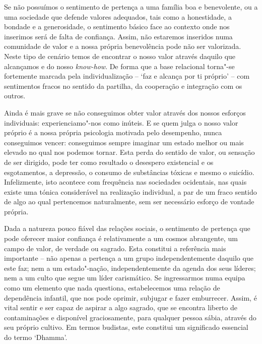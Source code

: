 Se não possuímos o sentimento de pertença a uma família boa e benevolente, ou a
uma sociedade que defende valores adequados, tais como a honestidade, a bondade
e a generosidade, o sentimento básico face ao contexto onde nos inserimos será
de falta de confiança. Assim, não estaremos inseridos numa comunidade de valor e
a nossa própria benevolência pode não ser valorizada. Neste tipo de cenário
temos de encontrar o nosso valor através daquilo que alcançamos e do nosso
\emph{know-how}. De forma que a base relacional torna"-se fortemente marcada
pela individualização -- `faz e alcança por ti próprio' -- com sentimentos
fracos no sentido da partilha, da cooperação e integração com os outros.

Ainda é mais grave se não conseguimos obter valor através dos nossos esforços
individuais: experienciamo"-nos como inúteis. E se quem julga o nosso valor
próprio é a nossa própria psicologia motivada pelo desempenho, nunca conseguimos
vencer: conseguimos sempre imaginar um estado melhor ou mais elevado no qual nos
podemos tornar. Esta perda do sentido de valor, ou sensação de ser dirigido,
pode ter como resultado o desespero existencial e os esgotamentos, a depressão,
o consumo de substâncias tóxicas e mesmo o suicídio. Infelizmente, isto acontece
com frequência nas sociedades ocidentais, nas quais existe uma tónica
considerável na realização individual, a par de um fraco sentido de algo ao qual
pertencemos naturalmente, sem ser necessário esforço de vontade própria.

Dada a natureza pouco fiável das relações sociais, o sentimento de pertença que
pode oferecer maior confiança é relativamente a um cosmos abrangente, um campo
de valor, de verdade ou sagrado. Esta constitui a referência mais importante --
não apenas a pertença a um grupo independentemente daquilo que este faz; nem a
um estado"-nação, independentemente da agenda dos seus líderes; nem a um culto
que segue um líder carismático. Se ingressarmos numa equipa como um elemento que
nada questiona, estabelecemos uma relação de dependência infantil, que nos pode
oprimir, subjugar e fazer emburrecer. Assim, é vital sentir e ser capaz de
aspirar a algo sagrado, que se encontra liberto de contaminações e disponível
graciosamente, para qualquer pessoa sábia, através do seu próprio cultivo. Em
termos budistas, este constitui um significado essencial do termo `Dhamma'.

